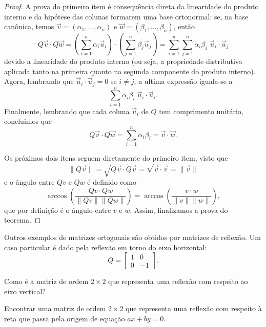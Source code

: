 \documentclass[../livro.tex]{subfiles}  %
\begin{document}
\begin{proof}
A prova do primeiro item é consequência direta da linearidade do produto interno e da hipótese das colunas formarem uma base ortonormal: se, na base canônica, temos $\vec{v} = (\alpha_1,..., \alpha_n)$ e $\vec{w} = (\beta_1, ..., \beta_n)$, então
$$Q\vec{v} \cdot Q\vec{w} = \left( \sum_{i=1}^n \alpha_i \vec{u}_i \right) \cdot \left(   \sum_{j=1}^n \beta_j \vec{u}_j \right) =  \sum_{i=1}^n \sum_{j=1}^n \alpha_i \beta_j \;\vec{u}_i \cdot \vec{u}_j$$ 
devido a linearidade do produto interno (ou seja, a propriedade distributiva aplicada tanto na primeira quanto na segunda componente do produto interno). Agora, lembrando que $\vec{u}_i \cdot \vec{u}_j=0$ se $i \neq j$, a ultima expressão iguala-se a 
$$ \sum_{i=1}^n \alpha_i \beta_i \; \vec{u}_i \cdot \vec{u}_i.$$
Finalmente, lembrando que cada coluna $\vec{u}_i$ de $Q$ tem comprimento unitário, concluimos que
$$Q\vec{v} \cdot Q\vec{w} = \sum_{i=1}^n \alpha_i \beta_i = \vec{v} \cdot \vec{w}.$$
 
 
 Os próximos dois itens seguem diretamente do primeiro item, visto que 
$$\| Q \vec{v} \| = \sqrt{Q\vec{v} \cdot Q\vec{v}} = \sqrt{\vec{v} \cdot \vec{v}} =  \| \vec{v} \| $$ 
e 
o ângulo entre $Qv$ e $Qw$ é definido como 
$$
\arccos\left(\frac{Qv \cdot Qw	}{\|Qv\| \|Qw\|} \right)
=\arccos\left(\frac{v \cdot w	}{\|v\| \|w\|} \right),$$ 
que por definição é o ângulo  entre $v$ e $w$. 
Assim, finalizamos a prova do teorema. 
\end{proof}
 
 
 
 
Outros exemplos de matrizes ortogonais são obtidos por matrizes de reflexão. Um caso particular é dado pela reflexão em torno do eixo horizontal: 
 \[
 Q =
 \begin{bmatrix}
 1 & 0 \\
 0 & -1
 \end{bmatrix}.\]
 
 \begin{exercise}
Como é a matriz de ordem $2 \times 2$ que representa uma reflexão com respeito ao eixo vertical?
 \end{exercise}

 \begin{exercise}
Encontrar uma matriz de ordem $2 \times 2$ que representa uma reflexão com respeito à reta que passa pela origem de equação $ax + b y = 0$.
\end{exercise}
\end{document}
